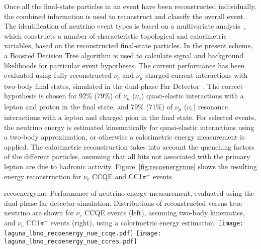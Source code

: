 Once all the final-state particles in an event have been reconstructed individually, 
the combined information is used to reconstruct and classify the overall event.
The identification of neutrino event types is based on a 
multivariate analysis~\cite{Back:2013cva,WA105_TDR,LAGUNA-LBNO-deliv,LAGUNA-LBNO-EOI},
which constructs a number of characteristic topological and calorimetric variables,
based on the reconstructed final-state particles. In the present scheme,
a Boosted Decision Tree algorithm is used to calculate signal and background likelihoods 
for particular event hypotheses. The current performance has been evaluated using fully reconstructed
$\nu_{e}$ and $\nu_{\mu}$ charged-current interactions with two-body final states,
simulated in the dual-phase Far Detector~\cite{LAGUNA-LBNO-deliv}. 
The correct hypothesis is chosen for 92\% (79\%) of $\nu_{\mu}$ ($\nu_{e}$) quasi-elastic interactions 
with a lepton and proton in the final state, and 79\% (71\%) of $\nu_{\mu}$ ($\nu_{e}$) 
resonance interactions with a lepton and charged pion in the final state.
For selected events, the neutrino energy is estimated kinematically for quasi-elastic interactions
using a two-body approximation, or otherwise a calorimetric energy measurement is applied.
The calorimetric reconstruction takes into account the quenching factors of the different particles, 
assuming that all hits not associated with the primary lepton are due to hadronic activity.
Figure~\ref{fig:recoenergynue} shows the resulting energy reconstruction for $\nu_e$ CCQE and CC1$\pi^{+}$ events.

\begin{cdrfigure}{recoenergynue}
{Performance of neutrino energy measurement, evaluated using the dual-phase far detector simulation. 
Distributions of reconstructed versus true neutrino are shown for $\nu_{e}$ CCQE events (left),
assuming two-body kinematics, and $\nu_{e}$  CC1$\pi^{+}$ events (right),
using a calorimetric energy estimation.}
\texttt{[image: laguna\_lbno\_recoenergy\_nue\_ccqe.pdf]}
\texttt{[image: laguna\_lbno\_recoenergy\_nue\_ccres.pdf]}
\end{cdrfigure}


